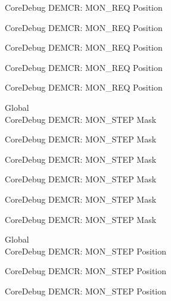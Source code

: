 \begin{DoxyRefList}
\label{deprecated__deprecated000191}%
%
Core\+Debug DEMCR\+: MON\+\_\+\+REQ Position 

\label{deprecated__deprecated000333}%
%
Core\+Debug DEMCR\+: MON\+\_\+\+REQ Position 

\label{deprecated__deprecated000409}%
%
Core\+Debug DEMCR\+: MON\+\_\+\+REQ Position 

\label{deprecated__deprecated000498}%
%
Core\+Debug DEMCR\+: MON\+\_\+\+REQ Position 

\label{deprecated__deprecated000600}%
%
Core\+Debug DEMCR\+: MON\+\_\+\+REQ Position  
\item[Global \doxylink{group___c_m_s_i_s___core_debug_ga2ded814556de96fc369de7ae9a7ceb98}{Core\+Debug\+\_\+\+DEMCR\+\_\+\+MON\+\_\+\+STEP\+\_\+\+Msk} ]\hfill \\
\label{deprecated__deprecated000050}%
%
Core\+Debug DEMCR\+: MON\+\_\+\+STEP Mask 

\label{deprecated__deprecated000194}%
%
Core\+Debug DEMCR\+: MON\+\_\+\+STEP Mask 

\label{deprecated__deprecated000336}%
%
Core\+Debug DEMCR\+: MON\+\_\+\+STEP Mask 

\label{deprecated__deprecated000412}%
%
Core\+Debug DEMCR\+: MON\+\_\+\+STEP Mask 

\label{deprecated__deprecated000501}%
%
Core\+Debug DEMCR\+: MON\+\_\+\+STEP Mask 

\label{deprecated__deprecated000603}%
%
Core\+Debug DEMCR\+: MON\+\_\+\+STEP Mask  
\item[Global \doxylink{group___c_m_s_i_s___core_debug_ga9ae10710684e14a1a534e785ef390e1b}{Core\+Debug\+\_\+\+DEMCR\+\_\+\+MON\+\_\+\+STEP\+\_\+\+Pos} ]\hfill \\
\label{deprecated__deprecated000049}%
%
Core\+Debug DEMCR\+: MON\+\_\+\+STEP Position 

\label{deprecated__deprecated000193}%
%
Core\+Debug DEMCR\+: MON\+\_\+\+STEP Position 

\label{deprecated__deprecated000335}%
%
Core\+Debug DEMCR\+: MON\+\_\+\+STEP Position 


\end{DoxyRefList}
